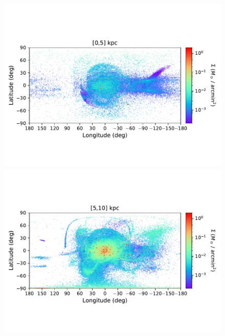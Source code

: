 \begin{figure}[h!]
\begin{center}
            \includegraphics[clip=true, trim = 0mm 20mm 0mm 20mm, width=\columnwidth]{images/PII_ensemble_LB_D0-5_mass_est_new.pdf}
            \includegraphics[clip=true, trim = 0mm 20mm 0mm 20mm, width=\columnwidth]{images/PII_ensemble_LB_D5-10_mass_est_new.pdf}


\end{center}
\end{figure}
